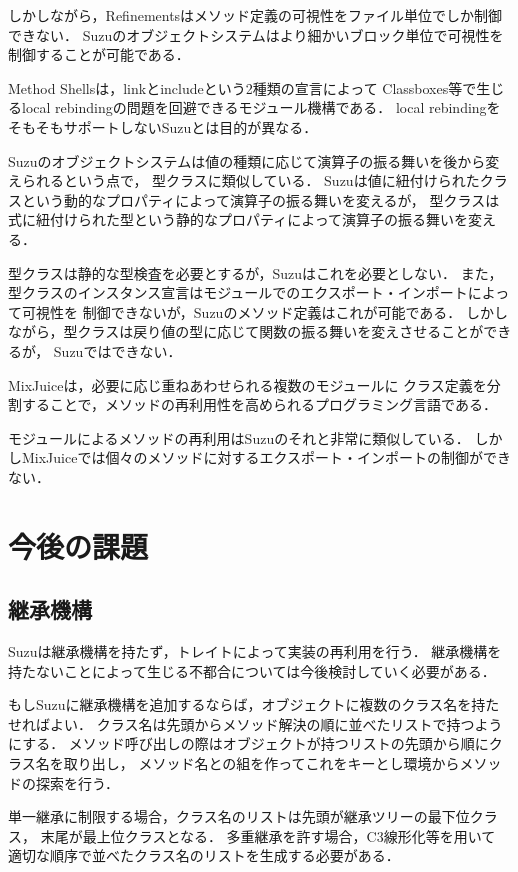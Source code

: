 \documentclass{ipsjprosym}
\begin{document}
しかしながら，Refinementsはメソッド定義の可視性をファイル単位でしか制御できない．
Suzuのオブジェクトシステムはより細かいブロック単位で可視性を制御することが可能である．

Method Shells\cite{Takeshita:2014-07-14}は，linkとincludeという2種類の宣言によって
Classboxes等で生じるlocal rebindingの問題を回避できるモジュール機構である．
local rebindingをそもそもサポートしないSuzuとは目的が異なる．

Suzuのオブジェクトシステムは値の種類に応じて演算子の振る舞いを後から変えられるという点で，
型クラス\cite{Wadler:1989:MAP:75277.75283}に類似している．
Suzuは値に紐付けられたクラスという動的なプロパティによって演算子の振る舞いを変えるが，
型クラスは式に紐付けられた型という静的なプロパティによって演算子の振る舞いを変える．

型クラスは静的な型検査を必要とするが，Suzuはこれを必要としない．
また，型クラスのインスタンス宣言はモジュールでのエクスポート・インポートによって可視性を
制御できないが，Suzuのメソッド定義はこれが可能である．
しかしながら，型クラスは戻り値の型に応じて関数の振る舞いを変えさせることができるが，
Suzuではできない．

MixJuice\cite{Ichisugi:2002}は，必要に応じ重ねあわせられる複数のモジュールに
クラス定義を分割することで，メソッドの再利用性を高められるプログラミング言語である．

モジュールによるメソッドの再利用はSuzuのそれと非常に類似している．
しかしMixJuiceでは個々のメソッドに対するエクスポート・インポートの制御ができない．

\section{今後の課題}

\subsection{継承機構}

Suzuは継承機構を持たず，トレイトによって実装の再利用を行う．
継承機構を持たないことによって生じる不都合については今後検討していく必要がある．

もしSuzuに継承機構を追加するならば，オブジェクトに複数のクラス名を持たせればよい．
クラス名は先頭からメソッド解決の順に並べたリストで持つようにする．
メソッド呼び出しの際はオブジェクトが持つリストの先頭から順にクラス名を取り出し，
メソッド名との組を作ってこれをキーとし環境からメソッドの探索を行う．

単一継承に制限する場合，クラス名のリストは先頭が継承ツリーの最下位クラス，
末尾が最上位クラスとなる．
多重継承を許す場合，C3線形化\cite{Barrett:1996:MSL:236337.236343}等を用いて
適切な順序で並べたクラス名のリストを生成する必要がある．
\end{document}

